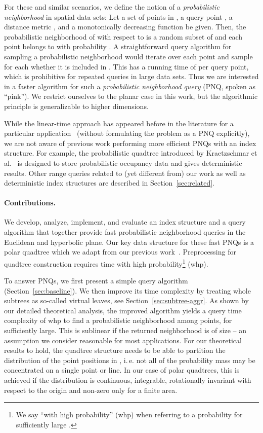 \documentclass{llncs}
\newcommand{\ie}{i.\,e.\xspace}
\newcommand{\etal}{et al.\xspace}
\begin{document}
For these and similar scenarios, we define the notion of a \emph{probabilistic neighborhood} in spatial data sets:
Let a set  of  points in , a query point , a distance metric , 
and a monotonically decreasing function  be given.
Then, the probabilistic neighborhood  of  with respect to  is 
a random subset of  and each point  belongs to  with probability .
A straightforward query algorithm for sampling a probabilistic neighborhood
would iterate over each point  and sample for each whether it is included in .
This has a running time of  per query point, which is prohibitive for repeated queries in large data sets.
Thus we are interested in a faster algorithm for such a \emph{probabilistic neighborhood query} (PNQ, spoken as ``pink'').
We restrict ourselves to the planar case in this work, but the algorithmic principle is generalizable to higher dimensions.

While the linear-time approach has appeared before in the literature for a particular application~\cite{Aldecoa2015} (without formulating the problem as a PNQ explicitly), we are not aware of previous work performing more efficient PNQs 
with an index structure. For example, the probabilistic quadtree introduced by Kraetzschmar \etal~\cite{kraetzschmar2004probabilistic} 
is designed to store probabilistic occupancy data and gives deterministic results.
Other range queries related to (yet different from) our work as well as deterministic index structures are described in Section~\ref{sec:related}.

\paragraph{Contributions.}
We develop, analyze, implement, and evaluate an index structure and a query algorithm that 
together provide fast probabilistic neighborhood queries in the Euclidean and hyperbolic plane.
Our key data structure for these fast PNQs is a polar quadtree which we adapt from our previous work~\cite{Looz2015HRG}.
Preprocessing for quadtree construction requires  time with high probability\footnote{We say ``with high probability'' (whp) when 
referring to a probability  for sufficiently large .} (whp).

To answer PNQs, we first present a simple query algorithm (Section~\ref{sec:baseline}).
We then improve its time complexity by treating whole subtrees as so-called virtual leaves, see Section~\ref{sec:subtree-aggr}.
As shown by our detailed theoretical analysis, the improved algorithm yields a query
time complexity of  whp to find a probabilistic neighborhood  among  points, for  sufficiently large. This is sublinear if the returned neighborhood  is of size 
-- an assumption we consider reasonable for most applications.
For our theoretical results to hold, the quadtree structure needs to be able to partition the distribution of the point positions in , \ie not all of the probability mass may be concentrated on a single point or line.
In our case of polar quadtrees, this is achieved if the distribution is continuous, integrable, rotationally invariant 
with respect to the origin and non-zero only for a finite area.
\end{document}
